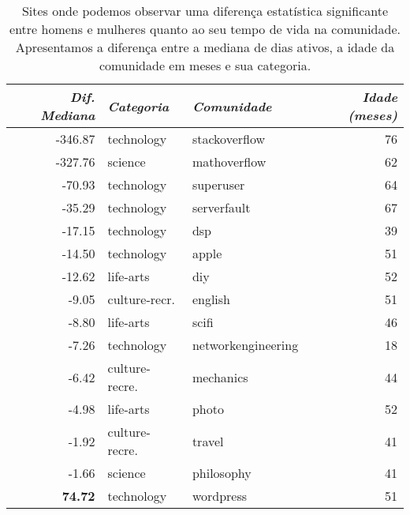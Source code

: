 \begin{table}[!b]
\centering
\begin{tabular}{@{}rllr@{}}
\toprule
{\small\textit{Dif. Mediana}} & {\small \textit{Categoria}} & {\small \textit{Comunidade}} & {\small \textit{Idade (meses) }} \\ \midrule
-346.87                            & technology         & stackoverflow      & 76                 \\ \midrule
-327.76                           & science            & mathoverflow       & 62                 \\ \midrule
-70.93                            & technology         & superuser          & 64                 \\ \midrule
-35.29                            & technology         & serverfault        & 67                 \\ \midrule
-17.15                            & technology         & dsp                & 39                 \\ \midrule
-14.50                            & technology         & apple              & 51                 \\ \midrule
-12.62                            & life-arts          & diy                & 52                 \\ \midrule
-9.05                             & culture-recr. & english            & 51                 \\ \midrule
-8.80                             & life-arts          & scifi              & 46                 \\ \midrule
-7.26                             & technology         & networkengineering & 18                 \\ \midrule
-6.42                             & culture-recre. & mechanics          & 44                 \\ \midrule
-4.98                             & life-arts          & photo              & 52                 \\ \midrule
-1.92                             & culture-recre. & travel             & 41                 \\ \midrule
-1.66                             & science            & philosophy         & 41                 \\ \midrule
\textbf{74.72}                             & technology         & wordpress          & 51                 \\ \bottomrule
\end{tabular}
\caption[Diferença de tempo de vida entre homens e mulheres]{Sites onde podemos observar uma diferença estatística significante entre homens e mulheres quanto ao seu tempo de vida na comunidade. Apresentamos a diferença entre a mediana de dias ativos, a idade da comunidade em meses e sua categoria.}~\label{table:lifetime}
\end{table}

